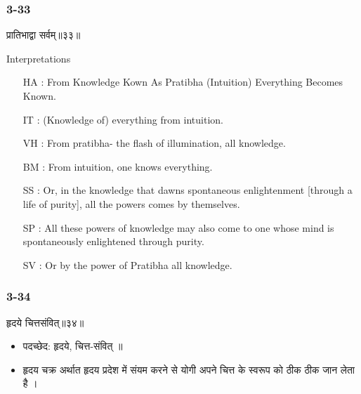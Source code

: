 \begin{frame}[fragile]\frametitle{3-33}
\begin{sanskrit}
प्रातिभाद्वा सर्वम्॥३३॥
\end{sanskrit}

Interpretations
\begin{itemize}	
\item [HA]: From Knowledge Kown As Pratibha (Intuition) Everything Becomes Known.
\item [IT]: (Knowledge of) everything from intuition.
\item [VH]: From pratibha- the flash of illumination, all knowledge.
\item [BM]: From intuition, one knows everything.
\item [SS]: Or, in the knowledge that dawns spontaneous enlightenment [through a life of purity], all the powers comes by themselves.
\item [SP]: All these powers of knowledge may also come to one whose mind is spontaneously enlightened through purity.
\item [SV]: Or by the power of Pratibha all knowledge. 
\end{itemize}
\end{frame}


\begin{frame}[fragile]\frametitle{3-34}
\begin{sanskrit}
हृदये चित्तसंवित्॥३४॥
\end{sanskrit}

\begin{itemize}
\item पदच्छेद:  हृदये, चित्त-संवित् ॥
\item हृदय चक्र अर्थात हृदय प्रदेश में संयम करने से योगी अपने चित्त के स्वरूप को ठीक ठीक जान लेता है ।
\end{itemize}
\end{frame}

